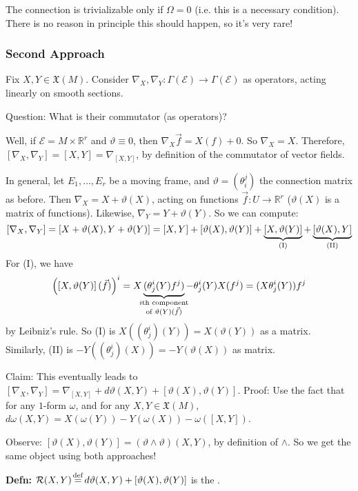 \documentclass[10pt,letterpaper]{article}
\newcommand{\n}{\hfill\break}
\newcommand{\hangblock}[2]{\par\noindent\settowidth{\hangindent}{\textbf{#1: }}\textbf{#1: }\nolinebreak#2}
\newcommand{\defn}[1]{\hangblock{Defn}{#1}}
\newcommand{\ptxt}[1]{\textrm{\textnormal{#1}}}
\newcommand{\reals}{\mathbb{R}}
\newcommand{\R}{\reals}
\newcommand{\labeledeq}[1]{\overset{\mathclap{\ptxt{#1}}}{=}}
\newcommand{\eqdef}{\labeledeq{def}}
\newcommand{\paren}[1]{\left(#1\right)}
\renewcommand{\brack}[1]{\left[#1\right]}
\let\u\relax
\newcommand{\u}[1]{\underline{#1}}
\newcommand{\mf}[1]{\mathfrak{#1}}
\begin{document}
\par\noindent
The connection is trivializable only if $\Omega=0$ (i.e. this is a necessary condition). There is no reason in principle this should happen, so it's very rare!

\subsubsection*{Second Approach}

\par\noindent
Fix $X,Y\in\mathfrak{X}(M)$. Consider $\nabla_{X},\nabla_{Y}:\Gamma(\mathcal{E})\to\Gamma(\mathcal{E})$ as operators, acting linearly on smooth sections.\n

\par\noindent
Question: What is their commutator (as operators)?\n

\par\noindent
Well, if $\mathcal{E}=M\times\R^{r}$ and $\vartheta\equiv{}0$, then $\nabla_{X}\vec{f}=X(f)+0$. So $\nabla_{X}=X$. Therefore, $\brack{\nabla_{X},\nabla_{Y}}=\brack{X,Y}=\nabla_{\brack{X,Y}}$, by definition of the commutator of vector fields.\n

\par\noindent
In general, let $E_{1},\ldots,E_{r}$ be a moving frame, and $\vartheta=(\theta_{i}^{j})$ the connection matrix as before. Then $\nabla_{X}=X+\vartheta(X)$, acting on functions $\vec{f}:U\to\R^{r}$ ($\vartheta(X)$ is a matrix of functions). Likewise, $\nabla_{Y}=Y+\vartheta(Y)$. So we can compute:
\[
	\brack{\nabla_{X},\nabla_{Y}}=\brack{X+\vartheta(X),Y+\vartheta(Y)}=\brack{X,Y}+\brack{\vartheta(X),\vartheta(Y)}+\underbrace{\brack{X,\vartheta(Y)}}_{\ptxt{(I)}}+\underbrace{\brack{\vartheta(X),Y}}_{\ptxt{(II)}}
\]
For (I), we have
\[
	\paren{\brack{X,\vartheta(Y)}(\vec{f})}^{i}=X\underbrace{(\theta_{j}^{i}(Y)f^{j})}_{\mathclap{\substack{
		\ptxt{$i$th component}\\
		\ptxt{of $\vartheta(Y)(\vec{f})$}
	}}}-\theta_{j}^{i}(Y)X(f^{j})=(X\theta_{j}^{i}(Y))f^{j}
\]
by Leibniz's rule. So (I) is $X((\theta_{j}^{i})(Y))=X(\vartheta(Y))$ as a matrix. Similarly, (II) is $-Y((\theta_{j}^{i})(X))=-Y(\vartheta(X))$ as matrix.\n

\par\noindent
Claim: This eventually leads to $\brack{\nabla_{X},\nabla_{Y}}=\nabla_{\brack{X,Y}}+d\vartheta(X,Y)+\brack{\vartheta(X),\vartheta(Y)}$.\n
Proof: Use the fact that for any $1$-form $\omega$, and for any $X,Y\in\mf{X}(M)$, $d\omega(X,Y)=X(\omega(Y))-Y(\omega(X))-\omega(\brack{X,Y})$.\n

\par\noindent
Observe: $\brack{\vartheta(X),\vartheta(Y)}=(\vartheta\wedge\vartheta)(X,Y)$, by definition of $\wedge$. So we get the same object using both approaches!\n

\defn{
	$\mathcal{R}(X,Y)\eqdef{}d\vartheta(X,Y)+\brack{\vartheta(X),\vartheta(Y)}$ is the \u{curvature operator}.\n
}
\end{document}
